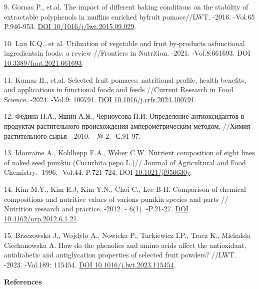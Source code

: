 \begin{refs}
9. Gornas P., et.al. The impact of different baking conditions on the
stability of extractable polyphenols in muffins enriched byfruit
pomace//LWT. -2016. -Vol.65 P.946-953.
\href{https://doi.org/10/1016/j/lwt.2015.09.029}{DOI
10/1016/j/lwt.2015.09.029}.

10. Lau K.Q., et al. Utilization of vegetable and fruit by-products
asfunctional ingredientsin foods: a review //Frontiers in Nutrition.
-2021. -Vol.8:661693. DOI
\href{https://doi/org/10.3389/fnut.2021.661693}{10.3389/fnut.2021.661693}.

11. Kumar H., et.al. Selected fruit pomaces: nutritional profile, health
benefits, and applications in functional foods and feeds //Current
Research in Food Science. -2024. -Vol.9: 100791.
\href{https://doi.org/?10.1016/j.crfs.2024.100791}{DOI
10.1016/j.crfs.2024.100791}.

12. Федина П.А., Яшин А.Я., Черноусова Н.И. Определение антиоксидантов в
продуктач растительного происхождения амперометрическим методом. //Химия
растительного сырья - 2010. - № 2. -С.91-97.

13. Idouraine A., Kohlhepp E.A., Weber C.W. Nutrient composition of
eight lines of naked seed pumkin (Cucurbita pepo L.)// Journal of
Agricultural and Food Chemistry. -1996. -Vol.44. P.721-724. DOI
\href{https://doi.org/10.1021/jf950630y}{10.1021/jf950630y}.

14. Kim M.Y., Kim E.J, Kim Y.N., Choi C., Lee B-H. Comparison of
chemical compositions and nutritive values of varions pumkin species and
parts // Nutrition research and practice. -2012. - 6(1). -P.21-27.
\href{https://doi.org/10.4162/nrp.2012.6.1.21}{DOI
10.4162/nrp.2012.6.1.21}.

15. Brzezowska J., Wojdylo A., Nowicka P., Turkiewicz I.P., Tracz K.,
Michalsla Ciechanowska A. How do the phenolics and amino acids affect
the antioxidant, antidiabetic and antiglycation properties of selected
fruit powders? //LWT. -2023. -Vol.189: 115454.
\href{https://doi.org/10/1016/j.lwt.2023.115454}{DOI
10.1016/j.lwt.2023.115454}.
\end{refs}

\begin{center}
{\bfseries References}
\end{center}

